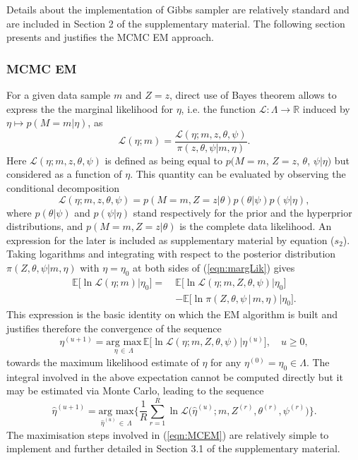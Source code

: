\documentclass{bioinfo}
\begin{document}
Details about the implementation of Gibbs sampler are relatively
standard and are included in Section 2 of the supplementary
material. The following section presents and justifies the MCMC EM  
approach. 

\subsubsection{MCMC EM}\label{sec:MCMCEM}
For a given data sample $m$ and $Z = z$, direct use of Bayes theorem 
allows to  express the the marginal likelihood for $\eta$, i.e. the
function $\mathcal L: \Lambda \to \mathbb R$ induced by $\eta 
\mapsto p(M=m|\eta)$, as
\begin{equation}
  \label{eqn:margLik}
  \mathcal L(\eta; m) 
  = \frac{\mathcal L(\eta; m, z, \theta, \psi)}{\pi(z,
      \theta, \psi|m, \eta)}.
\end{equation}
Here $\mathcal L(\eta; m, z, \theta, \psi)$ is 
defined as being equal to  $p(M=m$, $Z=z$, $\theta$,
$\psi|\eta)$ but considered as a function of $\eta$.  This quantity
can be evaluated by observing the conditional decomposition
\[
   \mathcal L(\eta; m, z, \theta, \psi) 
  = 
   p(M=m, Z=z|\theta) p(\theta|\psi)p(\psi|\eta), 
\]
where $p(\theta|\psi)$ and $p(\psi|\eta)$ stand respectively for the
prior and the hyperprior distributions, and $p(M=m, Z=z|\theta)$ is the
complete data likelihood. An expression for the later is included as 
supplementary material by equation ($s_2$). Taking
logarithms and integrating with respect to the posterior distribution
$\pi(Z, \theta, \psi|m, \eta)$ with $\eta = \eta_0$ at both sides of
(\ref{eqn:margLik}) gives 
\begin{align*}
   \mathbb E\big[\ln\mathcal L(\eta; m) \big| \eta_0\big] 
  =\ & 
  \mathbb E\big[\ln\mathcal L(\eta; m, Z, \theta, \psi)
    \big|  \eta_0\big]\\ 
  &-
  \mathbb E\big[\ln \pi(Z, \theta, \psi\,|\,m,\eta)\big| \eta_0\big].
\end{align*}  
This expression is the basic identity on which the EM algorithm is
built and justifies therefore the convergence of the sequence
\begin{equation}
 \label{eqn:EofMCEM}
  \eta^{(u+1)} = \underset{\eta\,\in\, \Lambda}{\text{arg max}}\, 
  \mathbb E\Big[\ln\mathcal L(\eta; m, Z, \theta, \psi)\big|
  \eta^{(u)}\Big], 
  \quad u\geq 0,
\end{equation}
towards the maximum likelihood estimate of $\eta$ for any $\eta^{(0)}
= \eta_0  \in \Lambda$. The integral involved in the above expectation
cannot be computed directly but it may be estimated via Monte Carlo,
leading to the sequence 
\begin{equation}
 \label{eqn:MCEM}
   \hat\eta^{(u+1)}
 = 
    \underset{\hat\eta^{(u)}\,\in\,\Lambda}{\text{arg max}} 
   \bigg\{
    \frac{1}{R}\sum_{r=1}^R 
      \ln\mathcal L\Big(\hat\eta^{(u)}; m, Z^{(r)}, \theta^{(r)},
      \psi^{(r)}\Big)
   \bigg\}.
\end{equation}
The maximisation steps involved in (\ref{eqn:MCEM}) are relatively
simple to implement and further detailed in Section 3.1 of the
supplementary material.
\end{document}
